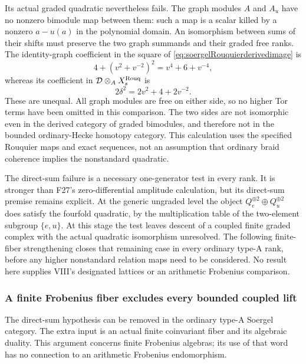 \documentclass[11pt,a4paper]{article}
\newcommand{\mathscr}{\mathcal}
\newcommand{\fid}[1]{\textsf{#1}}\newcommand{\gate}[1]{\textsf{#1}}
\theoremstyle{named}\newtheorem{finding}{Finding}[section]
\theoremstyle{definition}\newtheorem{definition}[finding]{Definition}
\theoremstyle{remark}\newtheorem{remark}[finding]{Remark}
\begin{document}
Its actual graded quadratic nevertheless fails. The graph
modules \(A\) and \(A_u\) have no nonzero bimodule map
between them: such a map is a scalar killed by a nonzero
\(a-u(a)\) in the polynomial domain. An isomorphism
between sums of their shifts must preserve the two graph
summands and their graded free ranks.
The identity-graph coefficient in the square of
\eqref{eq:soergelRouquierderivedimage} is
\[
               4+(v^2+v^{-2})^2=v^4+6+v^{-4},
\]
whereas its coefficient in
\(\mathscr D\otimes_A X_s^{\rm Rouq}\) is
\[
                         2\delta^2=2v^2+4+2v^{-2}.
\]
These are unequal. All graph modules are free on either
side, so no higher Tor terms have been omitted in this
comparison. The two sides are not isomorphic even in
the derived category of graded bimodules, and therefore
not in the bounded ordinary-Hecke homotopy category.
This calculation uses the specified Rouquier maps and
exact sequences, not an assumption that ordinary braid
coherence implies the nonstandard quadratic.

The direct-sum failure is a necessary one-generator test
in every rank. It is stronger than \fid{F27}'s
zero-differential amplitude calculation, but its
direct-sum premise remains explicit. At the generic
ungraded level the object
\(Q_e^{\oplus2}\oplus Q_u^{\oplus2}\) does satisfy the
fourfold quadratic, by the multiplication table of the
two-element subgroup \(\{e,u\}\).
At this stage the test leaves descent of a coupled finite
graded complex with the actual quadratic isomorphism unresolved.
The following finite-fiber strengthening closes that remaining
case in every ordinary type-A rank, before any higher
nonstandard relation maps need to be considered.
No result here supplies VIII's designated lattices or
an arithmetic Frobenius comparison.

\subsubsection{A finite Frobenius fiber excludes every bounded coupled lift}

The direct-sum hypothesis can be removed in the ordinary type-A
Soergel category. The extra input is an actual finite coinvariant
fiber and its algebraic duality. This argument concerns finite
Frobenius algebras; its use of that word has no connection to an
arithmetic Frobenius endomorphism.
\end{document}
